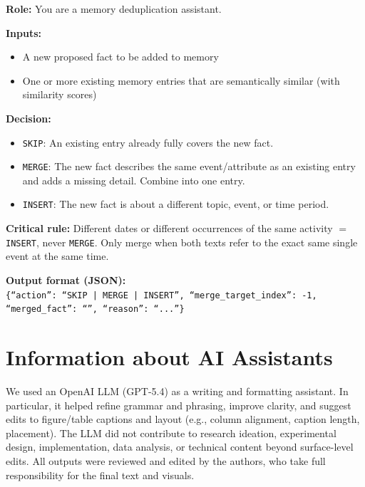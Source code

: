 \begin{table}[h]
\caption{The prompt template used for semantic consolidation (deduplication) in self-evolution.}
\begin{promptbox}
\noindent\textbf{Role:} You are a memory deduplication assistant.

\medskip
\noindent\textbf{Inputs:}
\begin{itemize}[leftmargin=*]
\item A new proposed fact to be added to memory
\item One or more existing memory entries that are semantically similar (with similarity scores)
\end{itemize}

\noindent\textbf{Decision:}
\begin{itemize}[leftmargin=*]
\item \texttt{SKIP}: An existing entry already fully covers the new fact.
\item \texttt{MERGE}: The new fact describes the same event/attribute as an existing entry and adds a missing detail. Combine into one entry.
\item \texttt{INSERT}: The new fact is about a different topic, event, or time period.
\end{itemize}

\medskip
\noindent\textbf{Critical rule:} Different dates or different occurrences of the same activity $=$ \texttt{INSERT}, never \texttt{MERGE}. Only merge when both texts refer to the exact same single event at the same time.

\medskip
\noindent\textbf{Output format (JSON):}\\
\texttt{\{``action'': ``SKIP | MERGE | INSERT'', ``merge\_target\_index'': -1, ``merged\_fact'': ``'', ``reason'': ``...''\}}
\end{promptbox}
\label{tab:prompt_dedup}
\end{table}

\section{Information about AI Assistants}
We used an OpenAI LLM (GPT-5.4) as a writing and formatting assistant. In particular, it helped refine
grammar and phrasing, improve clarity, and suggest edits to figure/table captions and layout (e.g.,
column alignment, caption length, placement). The LLM did not contribute to research ideation,
experimental design, implementation, data analysis, or technical content beyond surface-level edits.
All outputs were reviewed and edited by the authors, who take full responsibility for the final text
and visuals.